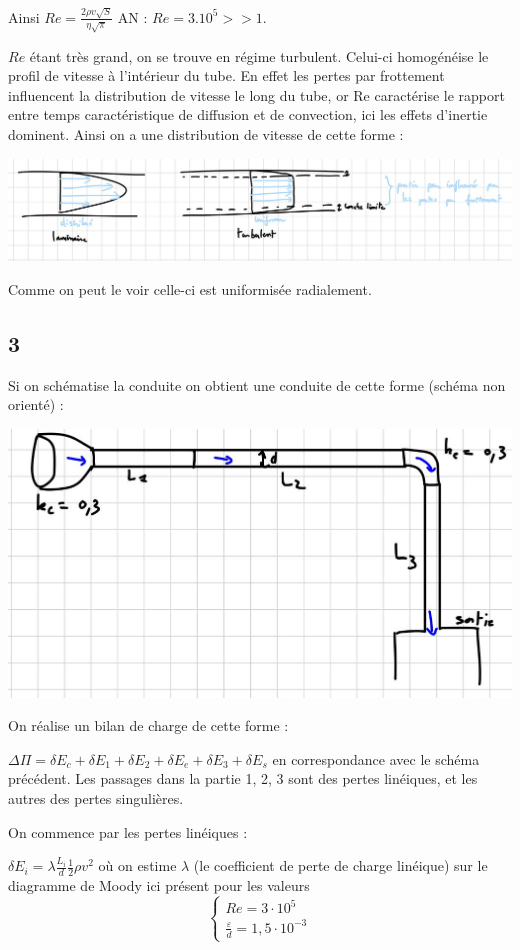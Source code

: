\documentclass[12pt]{article}
\begin{document}
Ainsi $\boxed{Re = \frac{2 \rho v \sqrt{S}}{\eta \sqrt{\pi}}}$ AN : $Re = 3.10^5 >> 1$.

$Re$ étant très grand, on se trouve en régime turbulent. Celui-ci homogénéise le profil de vitesse à l'intérieur du tube. En effet les pertes par frottement influencent la distribution de vitesse le long du tube, or Re caractérise le rapport entre temps caractéristique de diffusion et de convection, ici les effets d'inertie dominent. Ainsi on a une distribution de vitesse de cette forme : 

\includegraphics[scale=0.25]{1 image.jpg}

Comme on peut le voir celle-ci est uniformisée radialement. 

\subsection*{3}
Si on schématise la conduite on obtient une conduite de cette forme (schéma non orienté) :

\includegraphics[scale=0.4]{3 image.jpg}

On réalise un bilan de charge de cette forme :

$\Delta \Pi = \delta E_c + \delta E_1 + \delta E_2 + \delta E_e + \delta E_3 +\delta E_s$ en correspondance avec le schéma précédent. Les passages dans la partie 1, 2, 3 sont des pertes linéiques, et les autres des pertes singulières. 

On commence par les pertes linéiques :

$\delta E_i = \lambda \frac{L_i}{d} \frac{1}{2} \rho v^2$ où on estime $\lambda$ (le coefficient de perte de charge linéique) sur le diagramme de Moody ici présent pour les valeurs 
$$
\begin{cases}
Re = 3 \cdot 10^5 \\
\frac{\varepsilon}{d} = 1{,}5 \cdot 10^{-3}
\end{cases}
$$
\end{document}
